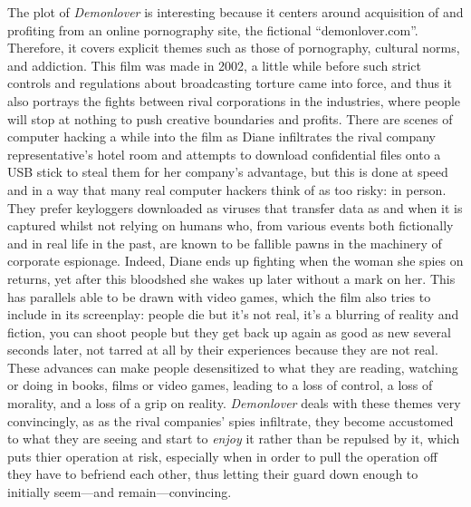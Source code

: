 \documentclass[12pt,a4paper]{article}
\begin{document}
The plot of \textit{Demonlover} is interesting because it centers
around acquisition of and profiting from an online pornography site,
the fictional ``demonlover.com''. Therefore, it covers explicit themes
such as those of pornography, cultural norms, and addiction. This film
was made in 2002, a little while before such strict controls and
regulations about broadcasting torture came into force, and thus it
also portrays the fights between rival corporations in the industries,
where people will stop at nothing to push creative boundaries and
profits. There are scenes of computer hacking a while into the film as
Diane infiltrates the rival company representative's hotel room and
attempts to download confidential files onto a USB stick to steal them
for her company's advantage, but this is done at speed and in a way
that many real computer hackers think of as too risky: in person.
They prefer keyloggers downloaded as viruses that transfer data as and
when it is captured whilst not relying on humans who, from various
events both fictionally and in real life in the past, are known to be
fallible pawns in the machinery of corporate espionage. Indeed, Diane
ends up fighting when the woman she spies on returns, yet after this
bloodshed she wakes up later without a mark on her. This has parallels
able to be drawn with video games, which the film also tries to
include in its screenplay: people die but it's not real, it's a
blurring of reality and fiction, you can shoot people but they get
back up again as good as new several seconds later, not tarred at all
by their experiences because they are not real. These advances can
make people desensitized to what they are reading, watching or doing
in books, films or video games, leading to a loss of control, a loss
of morality, and a loss of a grip on reality. \textit{Demonlover}
deals with these themes very convincingly, as as the rival companies'
spies infiltrate, they become accustomed to what they are seeing and
start to \textsl{enjoy} it rather than be repulsed by it, which puts
thier operation at risk, especially when in order to pull the
operation off they have to befriend each other, thus letting their
guard down enough to initially seem---and remain---convincing.\\
\end{document}

